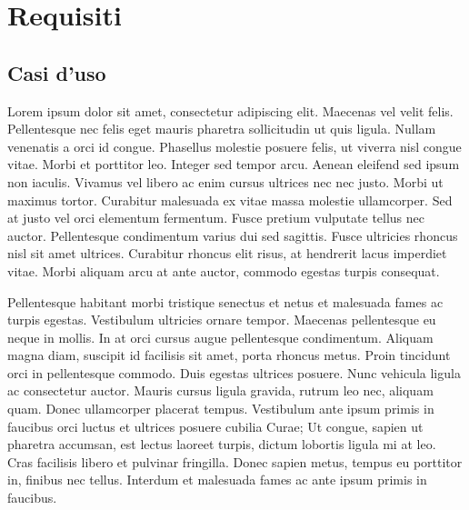 \documentclass[11pt,fleqn]{book} %
\begin{document}

\chapter{Requisiti}

\section{Casi d'uso}
Lorem ipsum dolor sit amet, consectetur adipiscing elit. Maecenas vel velit felis. Pellentesque nec felis eget mauris pharetra sollicitudin ut quis ligula. Nullam venenatis a orci id congue. Phasellus molestie posuere felis, ut viverra nisl congue vitae. Morbi et porttitor leo. Integer sed tempor arcu. Aenean eleifend sed ipsum non iaculis. Vivamus vel libero ac enim cursus ultrices nec nec justo. Morbi ut maximus tortor. Curabitur malesuada ex vitae massa molestie ullamcorper. Sed at justo vel orci elementum fermentum. Fusce pretium vulputate tellus nec auctor. Pellentesque condimentum varius dui sed sagittis. Fusce ultricies rhoncus nisl sit amet ultrices. Curabitur rhoncus elit risus, at hendrerit lacus imperdiet vitae. Morbi aliquam arcu at ante auctor, commodo egestas turpis consequat.

Pellentesque habitant morbi tristique senectus et netus et malesuada fames ac turpis egestas. Vestibulum ultricies ornare tempor. Maecenas pellentesque eu neque in mollis. In at orci cursus augue pellentesque condimentum. Aliquam magna diam, suscipit id facilisis sit amet, porta rhoncus metus. Proin tincidunt orci in pellentesque commodo. Duis egestas ultrices posuere. Nunc vehicula ligula ac consectetur auctor. Mauris cursus ligula gravida, rutrum leo nec, aliquam quam. Donec ullamcorper placerat tempus. Vestibulum ante ipsum primis in faucibus orci luctus et ultrices posuere cubilia Curae; Ut congue, sapien ut pharetra accumsan, est lectus laoreet turpis, dictum lobortis ligula mi at leo. Cras facilisis libero et pulvinar fringilla. Donec sapien metus, tempus eu porttitor in, finibus nec tellus. Interdum et malesuada fames ac ante ipsum primis in faucibus.
\end{document}
